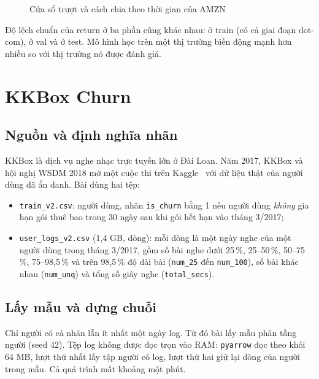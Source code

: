 \begin{figure}[H]
  \centering
  \caption{Cửa sổ trượt và cách chia theo thời gian của AMZN}
  \label{fig:window}
\end{figure}


Độ lệch chuẩn của return ở ba phần cũng khác nhau:  ở train (có cả giai đoạn dot-com),
 ở val và  ở test. Mô hình học trên một thị trường biến động mạnh hơn nhiều so
với thị trường nó được đánh giá.

\section{KKBox Churn}

\subsection{Nguồn và định nghĩa nhãn}

KKBox là dịch vụ nghe nhạc trực tuyến lớn ở Đài Loan. Năm 2017, KKBox và hội nghị WSDM 2018 mở một cuộc thi trên
Kaggle~\cite{kkbox2017} với dữ liệu thật của người dùng đã ẩn danh. Bài dùng hai tệp:
\begin{itemize}
  \item \texttt{train\_v2.csv}:  người dùng, nhãn \texttt{is\_churn} bằng 1 nếu người dùng
        \emph{không} gia hạn gói thuê bao trong 30 ngày sau khi gói hết hạn vào tháng 3/2017;
  \item \texttt{user\_logs\_v2.csv} (1,4 GB,  dòng): mỗi dòng là một ngày nghe của một người dùng
        trong tháng 3/2017, gồm số bài nghe dưới 25\,\%, 25--50\,\%, 50--75\,\%, 75--98,5\,\% và trên 98,5\,\% độ dài
        bài (\texttt{num\_25} đến \texttt{num\_100}), số bài khác nhau (\texttt{num\_unq}) và tổng số giây nghe
        (\texttt{total\_secs}).
\end{itemize}

\subsection{Lấy mẫu và dựng chuỗi}

Chỉ  người có cả nhãn lẫn ít nhất một ngày log. Từ đó bài lấy mẫu phân tầng
 người (seed 42). Tệp log không được đọc trọn vào RAM: \texttt{pyarrow} đọc theo khối 64 MB, lượt
thứ nhất lấy tập người có log, lượt thứ hai giữ lại  dòng của người trong mẫu. Cả quá trình mất
khoảng một phút.


